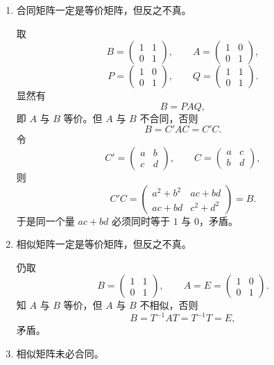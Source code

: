 \begin{enumerate}
\item 合同矩阵一定是等价矩阵，但反之不真。

取
\[
 B=\begin{pmatrix}1&1\\0&1\end{pmatrix},\qquad
 A=\begin{pmatrix}1&0\\0&1\end{pmatrix},
\]
\[
 P=\begin{pmatrix}1&0\\0&1\end{pmatrix},\qquad
 Q=\begin{pmatrix}1&1\\0&1\end{pmatrix}.
\]
显然有
\[
 B=PAQ,
\]
即 $A$ 与 $B$ 等价。但 $A$ 与 $B$ 不合同，否则
\[
 B=C'AC=C'C.
\]
令
\[
 C'=\begin{pmatrix}a&b\\c&d\end{pmatrix},\qquad
 C=\begin{pmatrix}a&c\\b&d\end{pmatrix},
\]
则
\[
 C'C=\begin{pmatrix}
 a^2+b^2&ac+bd\\
 ac+bd&c^2+d^2
 \end{pmatrix}=B.
\]
于是同一个量 $ac+bd$ 必须同时等于 $1$ 与 $0$，矛盾。

\item 相似矩阵一定是等价矩阵，但反之不真。

仍取
\[
 B=\begin{pmatrix}1&1\\0&1\end{pmatrix},\qquad
 A=E=\begin{pmatrix}1&0\\0&1\end{pmatrix}.
\]
知 $A$ 与 $B$ 等价，但 $A$ 与 $B$ 不相似，否则
\[
 B=T^{-1}AT=T^{-1}T=E,
\]
矛盾。

\item 相似矩阵未必合同。


\end{enumerate}
